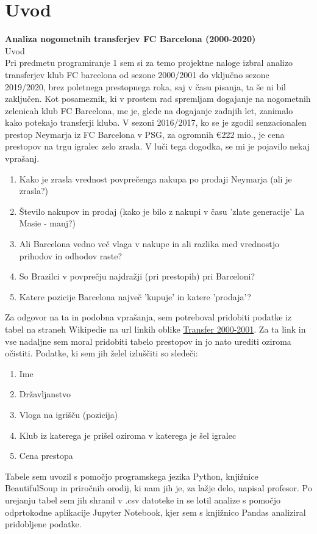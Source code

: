 \documentclass[a4paper, 12pt]{article}
\begin{document}
\section{Uvod}
\begin{center}
{\bf Analiza nogometnih transferjev FC Barcelona (2000-2020)}\\[3mm]
{\sc Uvod} \\ \medskip
Pri predmetu programiranje 1 sem si za temo projektne naloge izbral analizo transferjev klub FC barcelona od sezone 2000/2001
do vključno sezone 2019/2020, brez poletnega prestopnega roka, saj v času pisanja, ta še ni bil zaključen.
Kot posameznik, ki v prostem rad spremljam dogajanje na nogometnih zelenicah klub FC Barcelona, me je, glede na dogajanje zadnjih let, zanimalo kako potekajo transferji kluba. 
V sezoni 2016/2017, ko se je zgodil senzacionalen prestop Neymarja iz FC Barcelona v PSG, za ogromnih \euro 222 mio., je cena prestopov na trgu igralec zelo zrasla. V luči tega dogodka, se mi je pojavilo nekaj vprašanj.\\

\begin{enumerate}
\item Kako je zrasla vrednost povprečenga nakupa po prodaji Neymarja (ali je zrasla?)
\item Število nakupov in prodaj (kako je bilo z nakupi v času 'zlate generacije' La Masie - manj?)
\item Ali Barcelona vedno več vlaga v nakupe in ali razlika med vrednostjo prihodov in odhodov raste?
\item So Brazilci v povprečju najdražji (pri prestopih) pri Barceloni?
\item Katere pozicije Barcelona največ 'kupuje' in katere 'prodaja'?
\end{enumerate}

Za odgovor na ta in podobna vprašanja, sem potreboval pridobiti podatke iz tabel na straneh Wikipedie na url linkih oblike \href{https://en.wikipedia.org/wiki/2000-01_FC_Barcelona_season#Transfers}{Transfer 2000-2001}. 
Za ta link in vse nadaljne sem moral pridobiti tabelo prestopov in jo nato urediti oziroma očistiti. Podatke, ki sem jih želel izluščiti so sledeči:
\begin{enumerate}
\item Ime
\item Državljanstvo
\item Vloga na igrišču (pozicija)
\item Klub iz katerega je prišel oziroma v katerega je šel igralec
\item Cena prestopa
\end{enumerate}

Tabele sem uvozil s pomočjo programskega jezika Python, knjižnice BeautifulSoup in priročnih orodij, ki nam jih je, za lažje delo, napisal profesor. 
Po urejanju tabel sem jih shranil v .csv datoteke in se lotil analize s pomočjo odprtokodne aplikacije Jupyter Notebook, kjer sem s knjižnico Pandas analiziral pridobljene podatke.

\end{center}
\pagebreak
\end{document}

